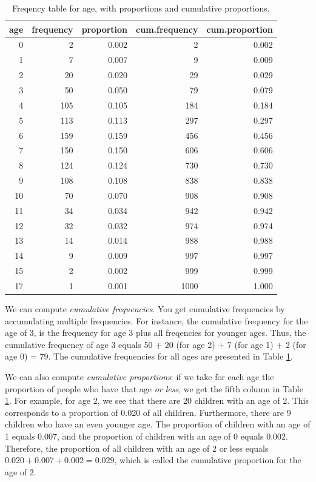 \documentclass[]{report}\usepackage[]{graphicx}\usepackage[]{color}
\begin{document}
\begin{table}[ht]
\centering
\caption{Freqency table for age, with proportions and cumulative proportions.} 
\label{tab:frequency_1}
\begin{tabular}{rrrrr}
  \hline
age & frequency & proportion & cum.frequency & cum.proportion \\ 
  \hline
   0 &    2 & 0.002 &    2 & 0.002 \\ 
     1 &    7 & 0.007 &    9 & 0.009 \\ 
     2 &   20 & 0.020 &   29 & 0.029 \\ 
     3 &   50 & 0.050 &   79 & 0.079 \\ 
     4 &  105 & 0.105 &  184 & 0.184 \\ 
     5 &  113 & 0.113 &  297 & 0.297 \\ 
     6 &  159 & 0.159 &  456 & 0.456 \\ 
     7 &  150 & 0.150 &  606 & 0.606 \\ 
     8 &  124 & 0.124 &  730 & 0.730 \\ 
     9 &  108 & 0.108 &  838 & 0.838 \\ 
    10 &   70 & 0.070 &  908 & 0.908 \\ 
    11 &   34 & 0.034 &  942 & 0.942 \\ 
    12 &   32 & 0.032 &  974 & 0.974 \\ 
    13 &   14 & 0.014 &  988 & 0.988 \\ 
    14 &    9 & 0.009 &  997 & 0.997 \\ 
    15 &    2 & 0.002 &  999 & 0.999 \\ 
    17 &    1 & 0.001 & 1000 & 1.000 \\ 
   \hline
\end{tabular}
\end{table}



We can compute \textit{cumulative frequencies}. You get cumulative frequencies by accumulating multiple frequencies. For instance, the cumulative frequency for the age of 3, is the frequency for age 3 plus all freqencies for younger ages. Thus, the cumulative frequency of age 3 equals 50 + 20 (for age 2) + 7 (for age 1) + 2 (for age 0) = 79. The cumulative frequencies for all ages are presented in Table \ref{tab:frequency_1}.

We can also compute \textit{cumulative proportions}: if we take for each age the proportion of people who have that age \textit{or less}, we get the fifth column in Table \ref{tab:frequency_1}. For example, for age 2, we see that there are 20 children with an age of 2. This corresponds to a proportion of 0.020 of all children. Furthermore, there are 9 children who have an even younger age. The proportion of children with an age of 1 equals 0.007, and the proportion of children with an age of 0 equals 0.002. Therefore, the proportion of all children with an age of 2 or less equals $0.020+0.007+0.002=0.029$, which is called the cumulative proportion for the age of 2.
\end{document}
